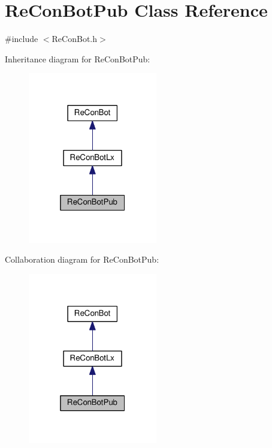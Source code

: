 \hypertarget{class_re_con_bot_pub}{}\section{Re\+Con\+Bot\+Pub Class Reference}
\label{class_re_con_bot_pub}


{\ttfamily \#include $<$Re\+Con\+Bot.\+h$>$}



Inheritance diagram for Re\+Con\+Bot\+Pub\+:\nopagebreak
\begin{figure}[H]
\begin{center}
\leavevmode
\includegraphics[width=160pt]{d3/d0f/class_re_con_bot_pub__inherit__graph}
\end{center}
\end{figure}


Collaboration diagram for Re\+Con\+Bot\+Pub\+:\nopagebreak
\begin{figure}[H]
\begin{center}
\leavevmode
\includegraphics[width=160pt]{dc/d8a/class_re_con_bot_pub__coll__graph}
\end{center}
\end{figure}
